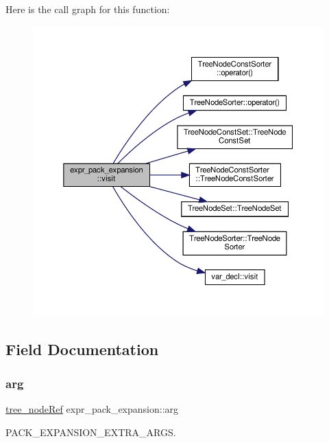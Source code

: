 Here is the call graph for this function\+:
\nopagebreak
\begin{figure}[H]
\begin{center}
\leavevmode
\includegraphics[width=350pt]{dd/d22/structexpr__pack__expansion_aeebf07512e982ce8b1fb21276362c6d4_cgraph}
\end{center}
\end{figure}


\subsection{Field Documentation}
\mbox{\label{structexpr__pack__expansion_ac024d9af3a37176f8ea79cd114e5e629}} 
\subsubsection{\texorpdfstring{arg}{arg}}
{\footnotesize\ttfamily \hyperlink{tree__node_8hpp_a6ee377554d1c4871ad66a337eaa67fd5}{tree\+\_\+node\+Ref} expr\+\_\+pack\+\_\+expansion\+::arg}



P\+A\+C\+K\+\_\+\+E\+X\+P\+A\+N\+S\+I\+O\+N\+\_\+\+E\+X\+T\+R\+A\+\_\+\+A\+R\+GS. 



